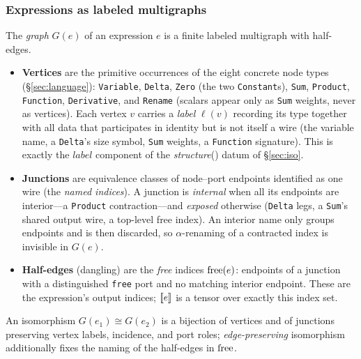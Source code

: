 \documentclass[sigplan,10pt,review]{acmart}
\begin{document}
\subsubsection*{Expressions as labeled multigraphs}

\begin{definition}\label{def:graph}
The \emph{graph} $G(e)$ of an expression $e$ is a finite labeled
multigraph with half-edges.
\begin{itemize}
\item \textbf{Vertices} are the primitive occurrences of the eight
  concrete node types (\S\ref{sec:language}): \texttt{Variable},
  \texttt{Delta}, \texttt{Zero} (the two \texttt{Constant}s),
  \texttt{Sum}, \texttt{Product}, \texttt{Function},
  \texttt{Derivative}, and \texttt{Rename} (scalars appear only as
  \texttt{Sum} weights, never as vertices). Each vertex
  $v$ carries a \emph{label} $\ell(v)$ recording its type together with
  all data that participates in identity but is not itself a wire (the
  variable name, a \texttt{Delta}'s size symbol, \texttt{Sum} weights,
  a \texttt{Function} signature). This is exactly the $\textit{label}$
  component of the \textit{structure}() datum of \S\ref{sec:iso}.
\item \textbf{Junctions} are equivalence classes of node--port
  endpoints identified as one wire (the \emph{named indices}). A
  junction is \emph{internal} when all its endpoints are interior---a
  \texttt{Product} contraction---and \emph{exposed} otherwise
  (\texttt{Delta} legs, a \texttt{Sum}'s shared output wire, a
  top-level free index). An interior name only groups endpoints and is
  then discarded, so $\alpha$-renaming of a contracted index is
  invisible in $G(e)$.
\item \textbf{Half-edges} (dangling) are the \emph{free} indices
  $\operatorname{free}(e)$: endpoints of a junction with a distinguished
  \texttt{free} port and no matching interior endpoint. These are the
  expression's output indices; $\left[\!\left[e\right]\!\right]$ is a tensor over exactly this
  index set.
\end{itemize}
An isomorphism $G(e_1)\cong G(e_2)$ is a bijection of vertices and of
junctions preserving vertex labels, incidence, and port roles;
\emph{edge-preserving} isomorphism additionally fixes the naming of the
half-edges in $\operatorname{free}$.
\end{definition}
\end{document}

